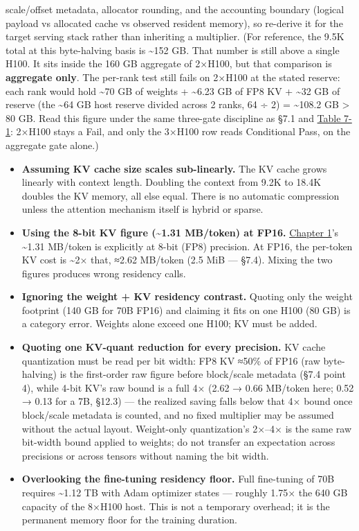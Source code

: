 \begin{enumerate}
  scale/offset metadata, allocator rounding, and the accounting boundary
  (logical payload vs allocated cache vs observed resident memory), so
  re-derive it for the target serving stack rather than inheriting a
  multiplier. (For reference, the 9.5K total at this byte-halving basis
  is \textasciitilde152 GB. That number is still above a single H100. It
  sits inside the 160 GB aggregate of 2×H100, but that comparison is
  \textbf{aggregate only}. The per-rank test still fails on 2×H100 at
  the stated reserve: each rank would hold \textasciitilde70 GB of
  weights + \textasciitilde6.23 GB of FP8 KV + \textasciitilde32 GB of
  reserve (the \textasciitilde64 GB host reserve divided across 2 ranks,
  64 ÷ 2) = \textasciitilde108.2 GB \textgreater{} 80 GB. Read this
  figure under the same three-gate discipline as §7.1 and \hyperref[tab:7.1]{Table 7-1}:
  2×H100 stays a Fail, and only the 3×H100 row reads Conditional Pass,
  on the aggregate gate alone.)
\end{enumerate}

\label{common-mistakes}


\begin{itemize}
\item
  \textbf{Assuming KV cache size scales sub-linearly.} The KV cache
  grows linearly with context length. Doubling the context from 9.2K to
  18.4K doubles the KV memory, all else equal. There is no automatic
  compression unless the attention mechanism itself is hybrid or sparse.
\item
  \textbf{Using the 8-bit KV figure (\textasciitilde1.31 MB/token) at
  FP16.} \hyperref[chap:1]{Chapter 1}'s \textasciitilde1.31 MB/token is explicitly at 8-bit
  (FP8) precision. At FP16, the per-token KV cost is \textasciitilde2×
  that, ≈2.62 MB/token (2.5 MiB --- §7.4). Mixing the two figures
  produces wrong residency calls.
\item
  \textbf{Ignoring the weight + KV residency contrast.} Quoting only the
  weight footprint (140 GB for 70B FP16) and claiming it fits on one
  H100 (80 GB) is a category error. Weights alone exceed one H100; KV
  must be added.
\item
  \textbf{Quoting one KV-quant reduction for every precision.} KV cache
  quantization must be read per bit width: FP8 KV ≈50\% of FP16 (raw
  byte-halving) is the first-order raw figure before block/scale
  metadata (§7.4 point 4), while 4-bit KV's raw bound is a full 4× (2.62
  → 0.66 MB/token here; 0.52 → 0.13 for a 7B, §12.3) --- the realized
  saving falls below that 4× bound once block/scale metadata is counted,
  and no fixed multiplier may be assumed without the actual layout.
  Weight-only quantization's 2×--4× is the same raw bit-width bound
  applied to weights; do not transfer an expectation across precisions
  or across tensors without naming the bit width.
\item
  \textbf{Overlooking the fine-tuning residency floor.} Full fine-tuning
  of 70B requires \textasciitilde1.12 TB with Adam optimizer states ---
  roughly 1.75× the 640 GB capacity of the 8×H100 host. This is not a
  temporary overhead; it is the permanent memory floor for the training
  duration.
\end{itemize}

